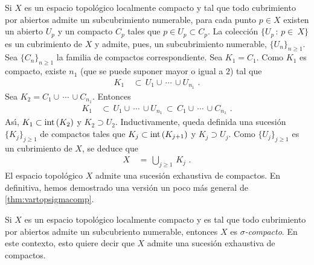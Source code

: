 \begin{remarkVarTopParacompII}\label{rem:vartopparacompII}
	Si $X$ es un espacio topol\'{o}gico localmente compacto y tal que
	todo cubrimiento por abiertos admite un subcubrimiento numerable,
	para cada punto $p\in X$ existen un abierto $U_{p}$ y un compacto
	$C_{p}$ tales que $p\in U_{p}\subset C_{p}$. La colecci\'{o}n
	$\{U_{p}\,:\,p\in\ X\}$ es un cubrimiento de $X$ y admite, pues, un
	subcubrimiento numerable, $\{U_{n}\}_{n\geq 1}$. Sea
	$\{C_{n}\}_{n\geq 1}$ la familia de compactos correspondiente.
	Sea $K_{1}=C_{1}$. Como $K_{1}$ es compacto, existe $n_{1}$
	(que se puede suponer mayor o igual a $2$) tal que
	\begin{align*}
		K_{1} & \,\subset\, U_{1}\cup\,\cdots\,\cup U_{n_{1}}
		\text{ .}
	\end{align*}
	Sea $K_{2}=C_{1}\cup\,\cdots\,\cup C_{n_{1}}$. Entonces
	\begin{align*}
		K_{1} & \,\subset\,U_{1}\cup\,\cdots\,\cup U_{n_{1}}
			\,\subset\, C_{1}\cup\,\cdots\,\cup C_{n_{1}}
		\text{ .}
	\end{align*}
	As\'{\i}, $K_{1}\subset\mathrm{int}\left(K_{2}\right)$ y $K_{2}\supset U_{2}$.
	Inductivamente, queda definida una sucesi\'{o}n $\{K_{j}\}_{j\geq 1}$
	de compactos tales que $K_{j}\subset\mathrm{int}\left(K_{j+1}\right)$ y
	$K_{j}\supset U_{j}$. Como $\{U_{j}\}_{j\geq 1}$ es un cubrimiento
	de $X$, se deduce que
	\begin{align*}
		X & \,=\,\bigcup_{j\geq 1}\,K_{j}
		\text{ .}
	\end{align*}
	El espacio topol\'{o}gico $X$ admite una sucesi\'{o}n exhaustiva de
	compactos. En definitiva, hemos demostrado una versi\'{o}n un poco
	m\'{a}s general de \ref{thm:vartopsigmacomp}.
\end{remarkVarTopParacompII}

\begin{propoVarTopSigmacomp}\label{thm:vartopsigmacompbis}
 Si $X$ es un espacio topol\'{o}gico localmente compacto y es tal
 que todo cubrimiento por abiertos admite un subcubriento numerable,
 entonces $X$ es \emph{$\sigma$-compacto}. En este contexto,
 esto quiere decir que $X$ admite una sucesi\'{o}n exhaustiva de
 compactos.
\end{propoVarTopSigmacomp}


